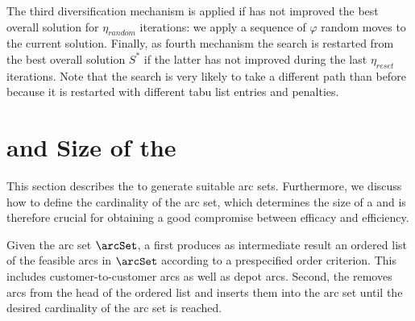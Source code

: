 \documentclass[11pt,a4paper,fleqn]{article}
\begin{document}
The third diversification mechanism is applied if \tsnew has not improved the best overall solution for $\eta_{\mathit{random}}$ iterations: we apply a sequence of $\varphi$ random moves to the current solution.
Finally, as fourth mechanism the search is restarted from the best overall solution $S^*$ if the latter has not improved during the last $\eta_{\mathit{reset}}$ iterations. Note that the search is very likely to take a different path than before because it is restarted with different tabu list entries and penalties. 

\section{\smsHeading and Size of the \gnsHeading}
\label{sec:sparsification}
This section describes the \sms to generate suitable \reduced arc sets. Furthermore, we discuss how to define the cardinality of the \reduced arc set, which determines the size of a \gn and is therefore crucial for obtaining a good compromise between efficacy and efficiency. 

Given the arc set $\arcSet$, a \sm first produces as intermediate result an ordered list of the feasible  arcs in $\arcSet$ according to a prespecified order criterion. This includes customer-to-customer arcs as well as  depot arcs. Second, the \sm removes arcs from the head of the ordered list and inserts them into the \reduced arc set \granularSet until the desired cardinality of the \reduced arc set is reached. 
\end{document}

